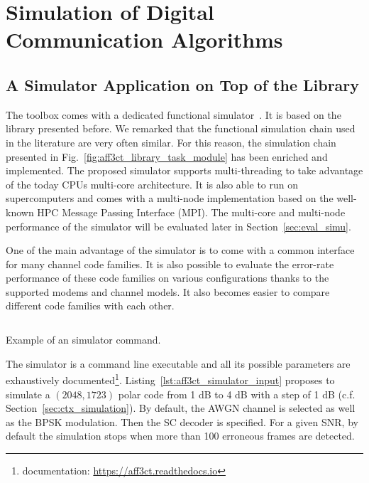 \section{Simulation of Digital Communication Algorithms}

\subsection{A Simulator Application on Top of the Library}
\label{sec:aff3ct_simulator_example}

The \AFFECT toolbox comes with a dedicated functional
simulator~\cite{Cassagne2017}. It is based on the \AFFECT library presented
before. We remarked that the functional simulation chain used in the literature
are very often similar. For this reason, the simulation chain presented in
Fig.~\ref{fig:aff3ct_library_task_module} has been enriched and implemented. The
proposed simulator supports multi-threading to take advantage of the today CPUs
multi-core architecture. It is also able to run on supercomputers and comes with
a multi-node implementation based on the well-known HPC Message Passing
Interface (MPI). The multi-core and multi-node performance of the \AFFECT
simulator will be evaluated later in Section~\ref{sec:eval_simu}.

One of the main advantage of the \AFFECT simulator is to come with a common
interface for many channel code families. It is also possible to evaluate the
error-rate performance of these code families on various configurations thanks
to the supported modems and channel models. It also becomes easier to compare
different code families with each other.

\begin{listing}[htp]
  \inputminted[frame=lines]{bash}{\curChapter/src/use_cases/simulator/input.txt}
  \caption{Example of an \AFFECT simulator command.}
  \label{lst:aff3ct_simulator_input}
\end{listing}

The \AFFECT simulator is a command line executable and all its possible
parameters are exhaustively documented\footnote{\AFFECT documentation:
\url{https://aff3ct.readthedocs.io}}. Listing~\ref{lst:aff3ct_simulator_input}
proposes to simulate a $(2048,1723)$ polar code from 1 dB to 4 dB with a step of
1 dB (c.f. Section~\ref{sec:ctx_simulation}). By default, the AWGN channel is
selected as well as the BPSK modulation. Then the SC decoder is specified. For a
given SNR, by default the simulation stops when more than 100 erroneous frames
are detected.

